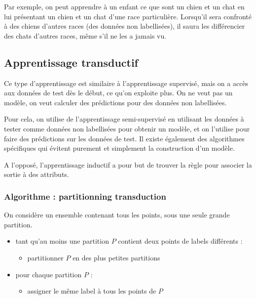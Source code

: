 			Par exemple, on peut apprendre à un enfant ce que sont un chien et un chat en lui présentant un chien et un chat d'une race particulière. Lorsqu'il sera confronté à des chiens d'autres races (des données non labellisées), il saura les différencier des chats d'autres races, même s'il ne les a jamais vu.
		
		\subsection{Apprentissage transductif}
		
		Ce type d'apprentissage est similaire à l'apprentissage supervisé, mais on a accès aux données de test dès le début, ce qu'on exploite plus. On ne veut pas un modèle, on veut calculer des prédictions pour des données non labellisées.
		
		Pour cela, on utilise de l'apprentissage semi-supervisé en utilisant les données à tester comme données non labellisées  pour obtenir un modèle, et on l'utilise pour faire des prédictions sur les données de test. Il existe également des algorithmes spécifiques qui évitent purement et simplement la construction d'un modèle.
		
		A l'opposé, l'apprentissage inductif a pour but de trouver la règle pour associer la sortie à des attributs.
		
		\subsubsection{Algorithme : partitionning transduction}
			
  		On considère un ensemble contenant tous les points, sous une seule grande partition.
  			
  		\begin{itemize}
  			\item tant qu'au moins une partition $P$ contient deux points de labels différents :
  			\begin{itemize}
  				\item partitionner $P$ en des plus petites partitions
  			\end{itemize}
  				
  			\item pour chaque partition $P$ :
  			\begin{itemize}
  				\item assigner le même label à tous les points de $P$
  			\end{itemize}
  		\end{itemize}

